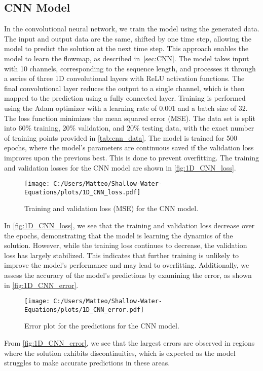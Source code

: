 \subsection*{CNN Model}
In the convolutional neural network, we train the model using the generated data.
The input and output data are the same, shifted by one time step, allowing the model to predict the solution at the next time step.
This approach enables the model to learn the flowmap, as described in~\autoref{sec:CNN}.
The model takes input with 10 channels, corresponding to the sequence length, and processes it through a series of three 1D convolutional layers with ReLU activation functions.
The final convolutional layer reduces the output to a single channel, which is then mapped to the prediction using a fully connected layer.
Training is performed using the Adam optimizer with a learning rate of $0.001$ and a batch size of $32$.
The loss function minimizes the mean squared error (MSE).
The data set is split into $60\%$ training, $20\%$ validation, and $20\%$ testing data, with the exact number of training points provided in \autoref{tab:cnn_data}.
The model is trained for 500 epochs, where the model's parameters are continuous saved if the validation loss improves upon the previous best.
This is done to prevent overfitting.
The training and validation losses for the CNN model are shown in \autoref{fig:1D_CNN_loss}.
\begin{figure}[H]
    \centering
    \texttt{[image: C:/Users/Matteo/Shallow-Water-Equations/plots/1D\_CNN\_loss.pdf]}
    \caption{Training and validation loss (MSE) for the CNN model.}\label{fig:1D_CNN_loss}
\end{figure}
In \autoref{fig:1D_CNN_loss}, we see that the training and validation loss decrease over the epochs, demonstrating that the model is learning the dynamics of the solution.
However, while the training loss continues to decrease, the validation loss has largely stabilized.
This indicates that further training is unlikely to improve the model's performance and may lead to overfitting.
Additionally, we assess the accuracy of the model's predictions by examining the error, as shown in \autoref{fig:1D_CNN_error}.
\begin{figure}[H]
    \centering
    \texttt{[image: C:/Users/Matteo/Shallow-Water-Equations/plots/1D\_CNN\_error.pdf]}
    \caption{Error plot for the predictions for the CNN model.}\label{fig:1D_CNN_error}
\end{figure}
From \autoref{fig:1D_CNN_error}, we see that the largest errors are observed in regions where the solution exhibits discontinuities, which is expected as the model struggles to make accurate predictions in these areas.
